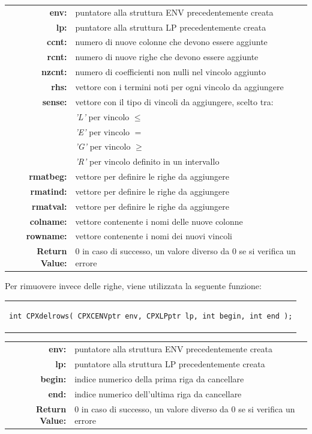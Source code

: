 \begin{table}[h]
\centering
\begin{tabular}{rl}
\textbf{env:} & {puntatore alla struttura ENV precedentemente creata}\\
\textbf{lp:} & {puntatore alla struttura LP precedentemente creata}\\
\textbf{ccnt:} & {numero di nuove colonne che devono essere aggiunte}\\
\textbf{rcnt:} & {numero di nuove righe che devono essere aggiunte}\\
\textbf{nzcnt:} & {numero di coefficienti non nulli nel vincolo aggiunto}\\
\textbf{rhs:} & {vettore con i termini noti per ogni vincolo da aggiungere}\\
\textbf{sense:} & {vettore con il tipo di vincoli da aggiungere, scelto tra:}\\
&{\textit{'L'} per vincolo $\leq$}\\
&{\textit{'E'} per vincolo $=$}\\
&{\textit{'G'} per vincolo $\geq$}\\
&{\textit{'R'} per vincolo definito in un intervallo}\\
\textbf{rmatbeg:} & {vettore per definire le righe da aggiungere}\\
\textbf{rmatind:} & {vettore per definire le righe da aggiungere}\\
\textbf{rmatval:} & {vettore per definire le righe da aggiungere}\\
\textbf{colname:} & {vettore contenente i nomi delle nuove colonne}\\
\textbf{rowname:} & {vettore contenente i nomi dei nuovi vincoli}\\
\textbf{Return Value:} & {0 in caso di successo, un valore diverso da 0 se si verifica un errore}\\
\end{tabular}
\end{table}
Per rimuovere invece delle righe, viene utilizzata la seguente funzione:
\begin{center}
\begin{tabular}{c}
\begin{lstlisting}[linewidth=330pt, basicstyle=\footnotesize\sffamily,]     
int CPXdelrows( CPXCENVptr env, CPXLPptr lp, int begin, int end );
\end{lstlisting}
\end{tabular}
\end{center}
\begin{table}[h]
\centering
\begin{tabular}{rl}
\textbf{env:} & {puntatore alla struttura ENV precedentemente creata}\\
\textbf{lp:} & {puntatore alla struttura LP precedentemente creata}\\
\textbf{begin:} & {indice numerico della prima riga da cancellare}\\
\textbf{end:} & {indice numerico dell'ultima riga da cancellare}\\
\textbf{Return Value:} & {0 in caso di successo, un valore diverso da 0 se si verifica un errore}\\
\end{tabular}
\end{table} 
